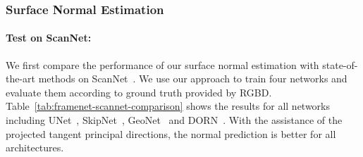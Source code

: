 \subsubsection{Surface Normal Estimation}
\label{sec:framenet-normal}

\paragraph{Test on ScanNet:}
We first compare the performance of our surface normal estimation with state-of-the-art methods on ScanNet~\cite{dai2017scannet}. 
We use our approach to train four networks and evaluate them according to ground truth provided by RGBD. Table~\ref{tab:framenet-scannet-comparison} shows the results for all networks including UNet~\cite{ronneberger2015u}, SkipNet~\cite{bansal2016marr}, GeoNet~\cite{qi2018geonet} and DORN~\cite{fu2018deep}. With the assistance of the projected tangent principal directions, the normal prediction is better for all architectures.

